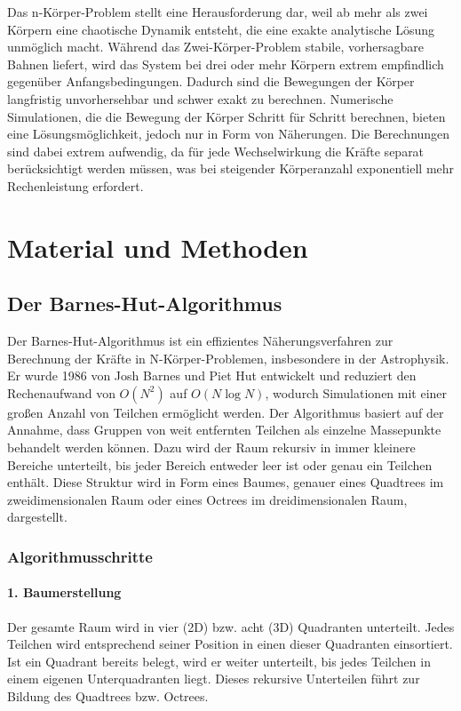 \documentclass[a4paper,12pt,twoside]{article}
\begin{document}
Das n-Körper-Problem stellt eine Herausforderung dar, weil ab mehr als zwei Körpern eine chaotische Dynamik entsteht, die eine exakte analytische Lösung unmöglich macht. Während das Zwei-Körper-Problem stabile, vorhersagbare Bahnen liefert, wird das System bei drei oder mehr Körpern extrem empfindlich gegenüber Anfangsbedingungen.
Dadurch sind die Bewegungen der Körper langfristig unvorhersehbar und schwer exakt zu berechnen. Numerische Simulationen, die die Bewegung der Körper Schritt für Schritt berechnen, bieten eine Lösungsmöglichkeit, jedoch nur in Form von Näherungen. Die Berechnungen sind dabei extrem aufwendig, da für jede Wechselwirkung die Kräfte separat berücksichtigt werden müssen, was bei steigender Körperanzahl exponentiell mehr Rechenleistung erfordert.


\section{Material und Methoden}

\subsection{Der Barnes-Hut-Algorithmus}
Der Barnes-Hut-Algorithmus ist ein effizientes Näherungsverfahren zur Berechnung der Kräfte in N-Körper-Problemen, insbesondere in der Astrophysik. Er wurde 1986 von Josh Barnes und Piet Hut entwickelt und reduziert den Rechenaufwand von $O(N^2)$ auf $O(N \log N)$, wodurch Simulationen mit einer großen Anzahl von Teilchen ermöglicht werden.
Der Algorithmus basiert auf der Annahme, dass Gruppen von weit entfernten Teilchen als einzelne Massepunkte behandelt werden können. Dazu wird der Raum rekursiv in immer kleinere Bereiche unterteilt, bis jeder Bereich entweder leer ist oder genau ein Teilchen enthält. Diese Struktur wird in Form eines Baumes, genauer eines Quadtrees im zweidimensionalen Raum oder eines Octrees im dreidimensionalen Raum, dargestellt.

\subsubsection{Algorithmusschritte}

\paragraph{1. Baumerstellung}
Der gesamte Raum wird in vier (2D) bzw. acht (3D) Quadranten unterteilt. Jedes Teilchen wird entsprechend seiner Position in einen dieser Quadranten einsortiert. Ist ein Quadrant bereits belegt, wird er weiter unterteilt, bis jedes Teilchen in einem eigenen Unterquadranten liegt. Dieses rekursive Unterteilen führt zur Bildung des Quadtrees bzw. Octrees.
\end{document}
